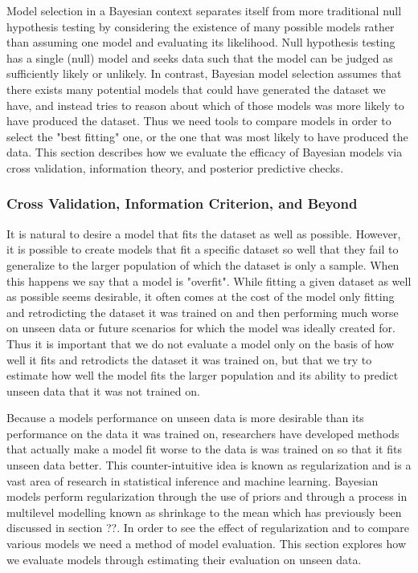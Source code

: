 Model selection in a Bayesian context separates itself from more traditional null hypothesis testing by considering the existence of many possible models rather than assuming one model and evaluating its likelihood. Null hypothesis testing has a single (null) model and seeks data such that the model can be judged as sufficiently likely or unlikely. In contrast, Bayesian model selection assumes that there exists many potential models that could have generated the dataset we have, and instead tries to reason about which of those models was more likely to have produced the dataset. Thus we need tools to compare models in order to select the "best fitting" one, or the one that was most likely to have produced the data. This section describes how we evaluate the efficacy of Bayesian models via cross validation, information theory, and posterior predictive checks.

\subsubsection{Cross Validation, Information Criterion, and Beyond}
It is natural to desire a model that fits the dataset as well as possible. However, it is possible to create models that fit a specific dataset so well that they fail to generalize to the larger population of which the dataset is only a sample. When this happens we say that a model is "overfit". While fitting a given dataset as well as possible seems desirable, it often comes at the cost of the model only fitting and retrodicting the dataset it was trained on and then performing much worse on unseen data or future scenarios for which the model was ideally created for. Thus it is important that we do not evaluate a model only on the basis of how well it fits and retrodicts the dataset it was trained on, but that we try to estimate how well the model fits the larger population and its ability to predict unseen data that it was not trained on.

Because a models performance on unseen data is more desirable than its performance on the data it was trained on, researchers have developed methods that actually make a model fit worse to the data is was trained on so that it fits unseen data better. This counter-intuitive idea is known as regularization and is a vast area of research in statistical inference and machine learning. Bayesian models perform regularization through the use of priors and through a process in multilevel modelling known as shrinkage to the mean which has previously been discussed in section ??. In order to see the effect of regularization and to compare various models we need a method of model evaluation. This section explores how we evaluate models through estimating their evaluation on unseen data.

